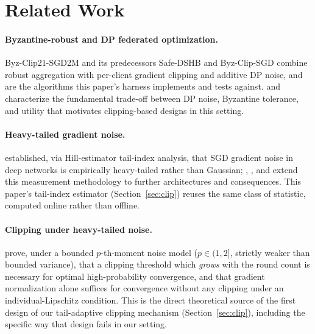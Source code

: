 \documentclass{article}
\begin{document}
\section{Related Work}
\label{sec:related}

\paragraph{Byzantine-robust and DP federated optimization.}
Byz-Clip21-SGD2M \citep{islamov2026byzclip} and its predecessors Safe-DSHB
\citep{allouah2023trilemma} and Byz-Clip-SGD \citep{islamov2026byzclip} combine
robust aggregation
\citep{karimireddy2020byzantine} with per-client gradient clipping and additive
DP noise, and are the algorithms this paper's harness implements and tests
against. \citet{guerraoui2021differential} and \citet{allouah2023trilemma}
characterize the fundamental trade-off between DP noise, Byzantine tolerance, and
utility that motivates clipping-based designs in this setting.

\paragraph{Heavy-tailed gradient noise.} \citet{simsekli2019tailindex} established,
via Hill-estimator tail-index analysis, that SGD gradient noise in deep networks
is empirically heavy-tailed rather than Gaussian; \citet{zhang2020adaptive},
\citet{gurbuzbalaban2021heavytail}, and \citet{barsbey2021compressibility} extend
this measurement methodology to further architectures and consequences. This
paper's tail-index estimator (Section~\ref{sec:clip}) reuses the same class of
statistic, computed online rather than offline.

\paragraph{Clipping under heavy-tailed noise.} \citet{sun2024gradnorm} prove,
under a bounded $p$-th-moment noise model ($p \in (1,2]$, strictly weaker than
bounded variance), that a clipping threshold which \emph{grows} with the round
count is necessary for optimal high-probability convergence, and that gradient
normalization alone suffices for convergence without any clipping under an
individual-Lipschitz condition. This is the direct theoretical source of the
first design of our tail-adaptive clipping mechanism (Section~\ref{sec:clip}),
including the specific way that design fails in our setting.
\end{document}
